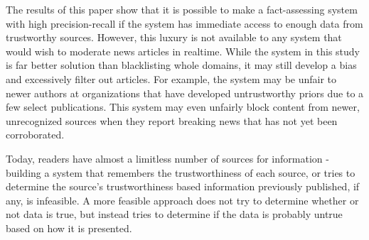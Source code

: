 The results of this paper show that it is possible to make a fact-assessing system with high precision-recall if the system has immediate access to enough data from trustworthy sources.  However, this luxury is not available to any system that would wish to moderate news articles in realtime.  While the system in this study is far better solution than blacklisting whole domains, it may still develop a bias and excessively filter out articles.  For example, the system may be unfair to newer authors at organizations that have developed untrustworthy priors due to a few select publications.  This system may even unfairly block content from newer, unrecognized sources when they report breaking news that has not yet been corroborated.

Today, readers have almost a limitless number of sources for information - building a system that remembers the trustworthiness of each source, or tries to determine the source's trustworthiness based information previously published, if any, is infeasible.  A more feasible approach does not try to determine whether or not data is true, but instead tries to determine if the data is probably untrue based on how it is presented.

